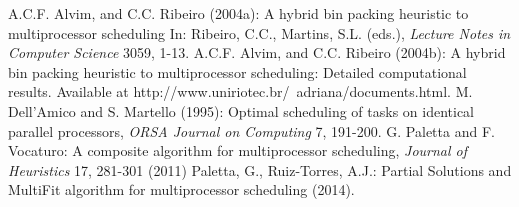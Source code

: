 \documentclass[12pt,a4paper]{article}
\begin{document}
\begin{thebibliography}{}
 A.C.F. Alvim, and C.C. Ribeiro (2004a): A hybrid bin packing heuristic to multiprocessor
scheduling In: Ribeiro, C.C., Martins, S.L. (eds.), \textit{Lecture
Notes in Computer Science} 3059, 1-13.
 A.C.F. Alvim, and C.C. Ribeiro (2004b): A hybrid bin packing heuristic to multiprocessor
scheduling: Detailed computational results. Available at
http://www.uniriotec.br/~adriana/documents.html.
M. Dell'Amico and S. Martello (1995): Optimal scheduling of tasks on
identical parallel processors, \textit {ORSA Journal on Computing}
7, 191-200.
 G. Paletta and F. Vocaturo: A composite algorithm for multiprocessor
scheduling, \textit{Journal of Heuristics} 17, 281-301 (2011)
\vspace{0.3cm}
Paletta, G., Ruiz-Torres, A.J.: Partial Solutions and MultiFit
algorithm for multiprocessor scheduling (2014).\vspace{0.3cm}\\

\end{thebibliography}
\end{document}
